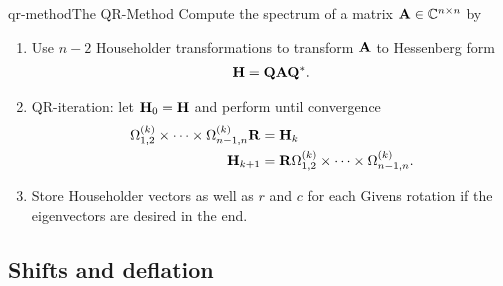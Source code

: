 \begin{Algorithm*}{qr-method}{The QR-Method}
  Compute the spectrum of a matrix $\mathbf A\in\mathbb C^{n\times n}$ by
  \begin{enumerate}
  \item Use $n-2$ Householder transformations to transform $\mathbf A$ to
    Hessenberg form
    \begin{gather}
     \mathbf H = \mathbf Q\mathbf A\mathbf Q^*.
   \end{gather}
 \item QR-iteration: let $\mathbf H_{0}=\mathbf H$ and perform until convergence
   \begin{align}
     \Omega^{(k)}_{1,2}\times\dots\times\Omega^{(k)}_{n-1,n} \mathbf R &= \mathbf H_k\\
     \mathbf H_{k+1} &= \mathbf R \Omega^{(k)}_{1,2}\times\dots\times\Omega^{(k)}_{n-1,n}.
   \end{align}
 \item Store Householder vectors as well as $r$ and $c$ for each
   Givens rotation if the eigenvectors are desired in the end.
  \end{enumerate}
\end{Algorithm*}

\subsection{Shifts and deflation}


